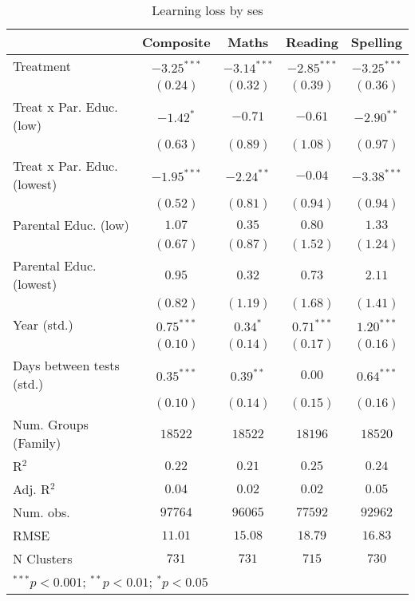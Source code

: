 
\begin{table}
\begin{center}
\begin{tabular}{l c c c c}
\hline
 & Composite & Maths & Reading & Spelling \\
\hline
Treatment                   & $-3.25^{***}$ & $-3.14^{***}$ & $-2.85^{***}$ & $-3.25^{***}$ \\
                            & $(0.24)$      & $(0.32)$      & $(0.39)$      & $(0.36)$      \\
Treat x Par. Educ. (low)    & $-1.42^{*}$   & $-0.71$       & $-0.61$       & $-2.90^{**}$  \\
                            & $(0.63)$      & $(0.89)$      & $(1.08)$      & $(0.97)$      \\
Treat x Par. Educ. (lowest) & $-1.95^{***}$ & $-2.24^{**}$  & $-0.04$       & $-3.38^{***}$ \\
                            & $(0.52)$      & $(0.81)$      & $(0.94)$      & $(0.94)$      \\
Parental Educ. (low)        & $1.07$        & $0.35$        & $0.80$        & $1.33$        \\
                            & $(0.67)$      & $(0.87)$      & $(1.52)$      & $(1.24)$      \\
Parental Educ. (lowest)     & $0.95$        & $0.32$        & $0.73$        & $2.11$        \\
                            & $(0.82)$      & $(1.19)$      & $(1.68)$      & $(1.41)$      \\
Year (std.)                 & $0.75^{***}$  & $0.34^{*}$    & $0.71^{***}$  & $1.20^{***}$  \\
                            & $(0.10)$      & $(0.14)$      & $(0.17)$      & $(0.16)$      \\
Days between tests (std.)   & $0.35^{***}$  & $0.39^{**}$   & $0.00$        & $0.64^{***}$  \\
                            & $(0.10)$      & $(0.14)$      & $(0.15)$      & $(0.16)$      \\
\hline
Num. Groups (Family)        & $18522$       & $18522$       & $18196$       & $18520$       \\
R$^2$                       & $0.22$        & $0.21$        & $0.25$        & $0.24$        \\
Adj. R$^2$                  & $0.04$        & $0.02$        & $0.02$        & $0.05$        \\
Num. obs.                   & $97764$       & $96065$       & $77592$       & $92962$       \\
RMSE                        & $11.01$       & $15.08$       & $18.79$       & $16.83$       \\
N Clusters                  & $731$         & $731$         & $715$         & $730$         \\
\hline
\multicolumn{5}{l}{\scriptsize{$^{***}p<0.001$; $^{**}p<0.01$; $^{*}p<0.05$}}
\end{tabular}
\caption{Learning loss by ses}
\label{tableses}
\end{center}
\end{table}
